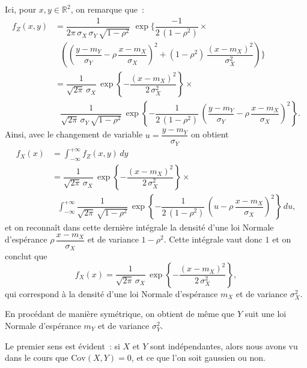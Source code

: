 \label{II-answer-covindepgauss-marg}
Ici, pour \(x,y \in \mathbb{R}^2\), on remarque que~: \begin{align*}
f_Z(x,y) &= \dfrac{1}{2\pi\,\sigma_X\,\sigma_Y\,\sqrt{1-\rho^2}}\,\,\exp\biggl\{ \dfrac{-1}{2\,\left( 1 - \rho^2 \right)}\times\\
&\ \ \ \left( \left(\dfrac{y-m_Y}{\sigma_Y} - \rho\,\dfrac{x-m_X}{\sigma_X}\right)^2 + (1 - \rho^2)\,\dfrac{(x-m_X)^2}{\sigma_X^2} \right) \biggr\}\\
& = \dfrac{1}{\sqrt{2\pi}\,\sigma_X}\,\exp\left\{-\dfrac{(x-m_X)^2}{2\,\sigma_X^2} \right\}\times\\
&\ \ \ \dfrac{1}{\sqrt{2\pi}\,\sigma_Y\,\sqrt{1-\rho^2}}\,\exp\left\{-\dfrac{1}{2\,(1-\rho^2)}\,\left(\dfrac{y-m_Y}{\sigma_Y} - \rho\,\dfrac{x-m_X}{\sigma_X}\right)^2 \right\}.
\end{align*} Ainsi, avec le changement de variable
\(u = \dfrac{y-m_Y}{\sigma_Y}\) on obtient \begin{align*}
f_X(x) &= \int_{-\infty}^{+\infty} f_Z(x,y)\,dy\\
&= \dfrac{1}{\sqrt{2\pi}\,\sigma_X}\,\exp\left\{-\dfrac{(x-m_X)^2}{2\,\sigma_X^2} \right\}\times\\
&\ \ \ \int_{-\infty}^{+\infty} \dfrac{1}{\sqrt{2\pi}\,\sqrt{1-\rho^2}}\,\exp\left\{-\dfrac{1}{2\,(1-\rho^2)}\,\left(u - \rho\,\dfrac{x-m_X}{\sigma_X}\right)^2 \right\}\,du,
\end{align*} et on reconnaît dans cette dernière intégrale la densité
d'une loi Normale d'espérance \(\rho\,\dfrac{x-m_X}{\sigma_X}\) et de
variance \(1-\rho^2\). Cette intégrale vaut donc \(1\) et on conclut que
\[f_X(x) = \dfrac{1}{\sqrt{2\pi}\,\sigma_X}\,\exp\left\{-\dfrac{(x-m_X)^2}{2\,\sigma_X^2} \right\}, \]
qui correspond à la densité d'une loi Normale d'espérance \(m_X\) et de
variance \(\sigma_X^2\).

En procédant de manière symétrique, on obtient de même que \(Y\) suit
une loi Normale d'espérance \(m_Y\) et de variance \(\sigma_Y^2\).

\label{II-answer-covindepgauss-indep}
Le premier sens est évident~: si \(X\) et \(Y\) sont indépendantes,
alors nous avons vu dans le cours que
\(\text{Cov}\left(X,Y\right) = 0\), et ce que l'on soit gaussien ou non.


